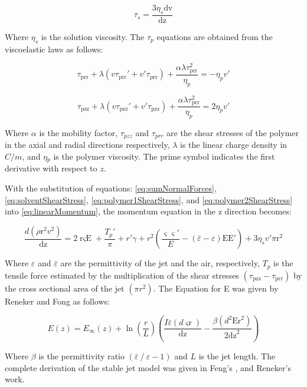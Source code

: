 \begin{equation}
\tau _s=\frac{3 \eta _s \text{dv}}{\text{dz}}
\label{eq:solventShearStress}
\end{equation}

Where $\eta_{s}$ is the solution viscosity. The $\tau_{p}$ equations are obtained from the viscoelastic laws \cite{Hinch} as follows:

\begin{equation}
\tau _{\text{prr}}+\lambda  \left(v \tau _{\text{prr}}'+v' \tau
   _{\text{prr}}\right)+\frac{\alpha  \lambda  \tau _{\text{prr}}^2}{\eta _p}=-\eta _p v'
\label{eq:polymer1ShearStress}
\end{equation}

\begin{equation}
\tau _{\text{pzz}}+\lambda  \left(v \tau _{\text{pzz}}'+v' \tau
   _{\text{pzz}}\right)+\frac{\alpha  \lambda  \tau _{\text{prr}}^2}{\eta _p}=2 \eta _p v'
\label{eq:polymer2ShearStress}
\end{equation}

Where $\alpha$ is the mobility factor, $\tau_{pzz}$ and $\tau_{prr}$ are the shear stresses of the polymer in the axial and radial directions respectively, $\lambda$ is the linear charge density in $C/m$, and $\eta{_p}$ is the polymer viscosity. The prime symbol indicates the first derivative with respect to $z$.

With the substitution of equations: \ref{eq:sumNormalForces}, \ref{eq:solventShearStress}, \ref{eq:polymer1ShearStress}, and \ref{eq:polymer2ShearStress} into \ref{eq:linearMomentum}, the momentum equation in the z direction \cite{Reneker2006} becomes:

\begin{equation}
\frac{d \left(\text{$\rho $r}^2 v^2\right)}{\text{dz}}=2
   \text{r$\varsigma$E}+\frac{T_p'}{\pi }+r' \gamma +r^2
   \left(\frac{\varsigma\varsigma'}{E}-\left(\bar{\varepsilon }-\varepsilon \right)
   \text{EE}'\right)+3 \eta _s v' \text{$\pi $r}^2
\label{eq:linearMomentumExpand}
\end{equation}

Where $\varepsilon$ and $\bar{\varepsilon}$ are the permittivity of the jet and the air, respectively, $T_{p}$ is the tensile force estimated by the multiplication of the shear stresses $\left(\tau_{\text{pzz}}-\tau_{\text{prr}}\right)$ by the cross sectional area of the jet $\left(\pi r^{2}\right)$. The Equation for E was given by Reneker and Fong \cite{Reneker2006} as follows:

\begin{equation}
E\left(z\right)=E_{\infty }\left(z\right)+\ln\left(\frac{r}{L}\right) \left(\frac{I \bar{\varepsilon } (d
   \text{$\varsigma$r})}{\text{dz}}-\frac{\beta  \left(d^2 \text{Er}^2\right)}{2
   \text{dz}^2}\right)
\label{eq:Eequation}
\end{equation}

Where $\beta$ is the permittivity ratio $\left(\bar{\varepsilon } \mathbin{/} \varepsilon -1\right)$ and $L$ is the jet length. The complete derivation of the stable jet model was given in Feng's \cite{Feng2002}, and Reneker's \cite{Reneker2006} work.